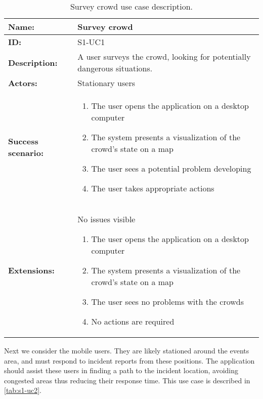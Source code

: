 \begin{table}[h!]
    \centering
    \begin{tabularx}{\textwidth}{|l|X|}
        \hline
        \textbf{Name:}  & Survey crowd \\ \hline
        \textbf{ID:}    & S1-UC1 \\ \hline
        \textbf{Description:} & A user surveys the crowd, looking for potentially dangerous situations. \\ \hline
        \textbf{Actors:} & Stationary users \\ \hline
        \textbf{Success scenario:} & 
        \begin{enumerate}
            \item The user opens the application on a desktop computer
            \item The system presents a visualization of the crowd's state on a map
            \item The user sees a potential problem developing
            \item The user takes appropriate actions
        \end{enumerate}
        \\ \hline
        \textbf{Extensions:} & No issues visible
        \begin{enumerate}
            \item The user opens the application on a desktop computer
            \item The system presents a visualization of the crowd's state on a map
            \item The user sees no problems with the crowds
            \item No actions are required
        \end{enumerate} 
        \\ \hline
    \end{tabularx}
    \caption{Survey crowd use case description.}
    \label{tab:s1-uc1}
\end{table}

Next we consider the mobile users. They are likely stationed around the events area, and must respond to incident reports from these positions. The application should assist these users in finding a path to the incident location, avoiding congested areas thus reducing their response time. This use case is described in \cref{tab:s1-uc2}.

